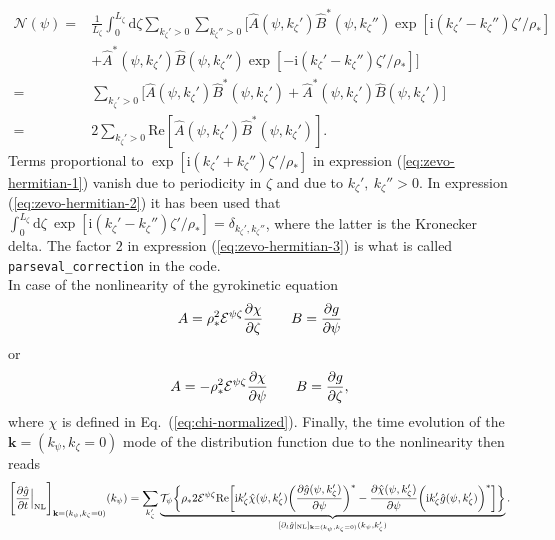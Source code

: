     \begin{align}
    \mathcal{N}(\psi)  = & \frac{1}{L_\zeta} \int_0^{L_\zeta} \mathrm{d} \zeta \sum_{k_\zeta'>0} \sum_{k_\zeta''>0} \biggl[ \hat A(\psi,k_\zeta') \hat B^\ast(\psi,k_\zeta'') \exp[\mathrm{i} (k_\zeta' - k_\zeta'')\zeta'/\rho_\ast] \nonumber \\
                         & + \hat A^\ast(\psi,k_\zeta') \hat B(\psi,k_\zeta'') \exp[-\mathrm{i} (k_\zeta' - k_\zeta'')\zeta'/\rho_\ast] \biggr] \label{eq:zevo-hermitian-1}\\
            = & \sum_{k_\zeta'>0} \biggl[ \hat A(\psi,k_\zeta') \hat B^\ast(\psi,k_\zeta') + \hat A^\ast(\psi,k_\zeta') \hat B(\psi,k_\zeta') \biggr] \label{eq:zevo-hermitian-2}\\
            = & 2 \sum_{k_\zeta'>0} \mathrm{Re}[\hat A(\psi,k_\zeta') \hat B^\ast(\psi,k_\zeta')].\label{eq:zevo-hermitian-3}
    \end{align}
Terms proportional to $\exp[\mathrm{i}(k_\zeta'+k_\zeta'') \zeta'/\rho_\ast]$ in expression (\ref{eq:zevo-hermitian-1}) vanish due to periodicity in $\zeta$ and due to $k_\zeta',~k_\zeta'' > 0$.
In expression (\ref{eq:zevo-hermitian-2}) it has been used that $\int_0^{L_\zeta} \mathrm{d}\zeta~\exp[\mathrm{i}(k_\zeta'-k_\zeta'') \zeta'/\rho_\ast] = \delta_{k_\zeta',k_\zeta''}$, where the latter is the Kronecker delta.
The factor $2$ in expression (\ref{eq:zevo-hermitian-3}) is what is called \texttt{parseval\_correction} in the code. \\
In case of the nonlinearity of the gyrokinetic equation
    \begin{equation}
    A = \rho_\ast^2 \mathcal{E}^{\psi \zeta} \frac{\partial \chi}{\partial \zeta} \hspace{20pt} B = \frac{\partial g}{\partial \psi}
    \end{equation}
or 
    \begin{equation}
    A = -\rho_\ast^2 \mathcal{E}^{\psi \zeta}\frac{\partial \chi}{\partial \psi} \hspace{20pt} B = \frac{\partial g}{\partial \zeta},
    \end{equation}
where $\chi$ is defined in Eq.~(\ref{eq:chi-normalized}).
Finally, the time evolution of the $\mathbf{k}=(k_\psi,k_\zeta=0)$ mode of the distribution function due to the nonlinearity then reads
    \begin{equation}
    \label{eq:zevo-hermitian}
    \Biggl[ \frac{\partial \hat g}{\partial t}\Big|_\mathrm{NL}\Biggr]_{\mathbf{k}=(k_\psi,k_\zeta=0)} (k_\psi) = \sum_{k_\zeta'} \underbrace{\mathcal{T}_\psi \biggl\{\rho_\ast 2 \mathcal{E}^{\psi \zeta} \mathrm{Re} \biggl[ \mathrm{i} k_\zeta' \hat \chi(\psi,k_\zeta') \biggl( \frac{\partial \hat g (\psi,k_\zeta')}{\partial \psi} \biggr)^\ast - \frac{\partial \hat \chi(\psi,k_\zeta')}{\partial \psi} \biggl( \mathrm{i} k_\zeta' \hat g(\psi,k_\zeta') \biggr)^\ast \biggr]\biggr\}}_{[\partial_t \hat g |_\mathrm{NL}]_{\mathbf{k}=(k_\psi,k_\zeta=0)}  (k_\psi,k_\zeta')}.
    \end{equation}
